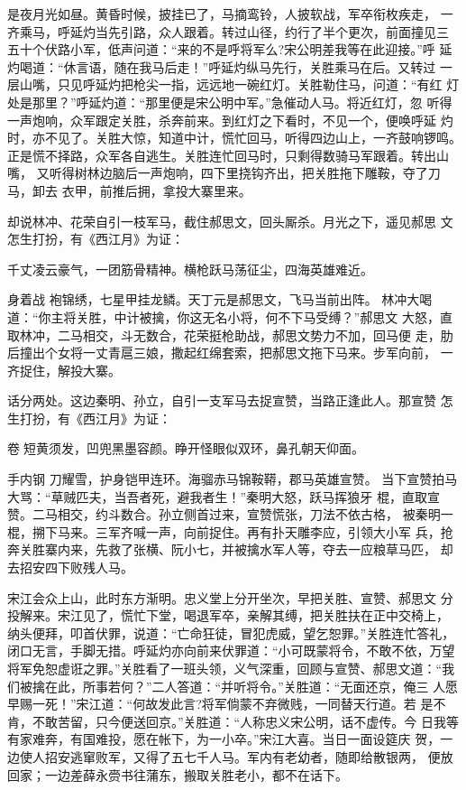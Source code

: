 是夜月光如昼。黄昏时候，披挂已了，马摘鸾铃，人披软战，军卒衔枚疾走，
一齐乘马，呼延灼当先引路，众人跟着。转过山径，约行了半个更次，前面撞见三
五十个伏路小军，低声问道：“来的不是呼将军么?宋公明差我等在此迎接。”呼
延灼喝道：“休言语，随在我马后走！”呼延灼纵马先行，关胜乘马在后。又转过
一层山嘴，只见呼延灼把枪尖一指，远远地一碗红灯。关胜勒住马，问道：“有红
灯处是那里？”呼延灼道：“那里便是宋公明中军。”急催动人马。将近红灯，忽
听得一声炮响，众军跟定关胜，杀奔前来。到红灯之下看时，不见一个，便唤呼延
灼时，亦不见了。关胜大惊，知道中计，慌忙回马，听得四边山上，一齐鼓响锣鸣。
正是慌不择路，众军各自逃生。关胜连忙回马时，只剩得数骑马军跟着。转出山嘴，
又听得树林边脑后一声炮响，四下里挠钩齐出，把关胜拖下雕鞍，夺了刀马，卸去
衣甲，前推后拥，拿投大寨里来。

却说林冲、花荣自引一枝军马，截住郝思文，回头厮杀。月光之下，遥见郝思
文怎生打扮，有《西江月》为证：

千丈凌云豪气，一团筋骨精神。横枪跃马荡征尘，四海英雄难近。

身着战
袍锦绣，七星甲挂龙鳞。天丁元是郝思文，飞马当前出阵。
林冲大喝道：“你主将关胜，中计被擒，你这无名小将，何不下马受缚？”郝思文
大怒，直取林冲，二马相交，斗无数合，花荣挺枪助战，郝思文势力不加，回马便
走，肋后撞出个女将一丈青扈三娘，撒起红绵套索，把郝思文拖下马来。步军向前，
一齐捉住，解投大寨。

话分两处。这边秦明、孙立，自引一支军马去捉宣赞，当路正逢此人。那宣赞
怎生打扮，有《西江月》为证：

卷短黄须发，凹兜黑墨容颜。睁开怪眼似双环，鼻孔朝天仰面。

手内钢
刀耀雪，护身铠甲连环。海骝赤马锦鞍鞯，郡马英雄宣赞。
当下宣赞拍马大骂：“草贼匹夫，当吾者死，避我者生！”秦明大怒，跃马挥狼牙
棍，直取宣赞。二马相交，约斗数合。孙立侧首过来，宣赞慌张，刀法不依古格，
被秦明一棍，搠下马来。三军齐喊一声，向前捉住。再有扑天雕李应，引领大小军
兵，抢奔关胜寨内来，先救了张横、阮小七，并被擒水军人等，夺去一应粮草马匹，
却去招安四下败残人马。

宋江会众上山，此时东方渐明。忠义堂上分开坐次，早把关胜、宣赞、郝思文
分投解来。宋江见了，慌忙下堂，喝退军卒，亲解其缚，把关胜扶在正中交椅上，
纳头便拜，叩首伏罪，说道：“亡命狂徒，冒犯虎威，望乞恕罪。”关胜连忙答礼，
闭口无言，手脚无措。呼延灼亦向前来伏罪道：“小可既蒙将令，不敢不依，万望
将军免恕虚诳之罪。”关胜看了一班头领，义气深重，回顾与宣赞、郝思文道：“我
们被擒在此，所事若何？”二人答道：“并听将令。”关胜道：“无面还京，俺三
人愿早赐一死！”宋江道：“何故发此言?将军倘蒙不弃微贱，一同替天行道。若
是不肯，不敢苦留，只今便送回京。”关胜道：“人称忠义宋公明，话不虚传。今
日我等有家难奔，有国难投，愿在帐下，为一小卒。”宋江大喜。当日一面设筵庆
贺，一边使人招安逃窜败军，又得了五七千人马。军内有老幼者，随即给散银两，
便放回家；一边差薛永赍书往蒲东，搬取关胜老小，都不在话下。

